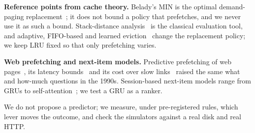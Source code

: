 \textbf{Reference points from cache theory.} Belady's MIN is the optimal
demand-paging replacement~\cite{belady1966study}; it does not bound a policy
that prefetches, and we never use it as such a bound. Stack-distance
analysis~\cite{mattson1970evaluation} is the classical evaluation tool, and
adaptive, FIFO-based and learned
eviction~\cite{megiddo2003arc,yang2023fifo,zhang2024sieve,yang2023glcache,
shi2019glider} change the replacement policy; we keep LRU fixed so that only
prefetching varies.

\textbf{Web prefetching and next-item models.} Predictive prefetching of web
pages~\cite{padmanabhan1996using}, its latency bounds~\cite{kroeger1997exploring}
and its cost over slow links~\cite{fan1999web} raised the same what and
how-much questions in the 1990s. Session-based next-item models range from
GRUs to self-attention~\cite{hidasi2016session,kang2018sasrec}; we test a GRU
as a ranker.

We do not propose a predictor; we measure, under pre-registered rules,
which lever moves the outcome, and check the simulators against a real disk
and real HTTP.
